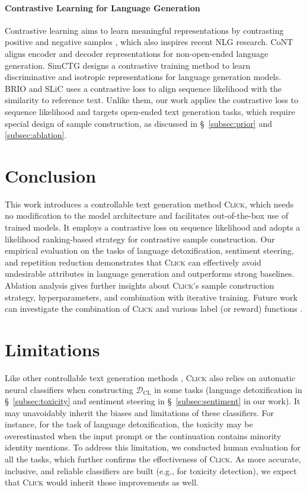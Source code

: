 \paragraph{Contrastive Learning for Language Generation} Contrastive learning aims to learn meaningful representations by contrasting positive and negative samples \cite{chen2020simple, he2020momentum, simcse}, which also inspires recent NLG research. CoNT \cite{cont} aligns encoder and decoder representations for non-open-ended language generation. SimCTG \cite{simctg} designs a contrastive training method to learn discriminative and isotropic representations for language generation models. BRIO \cite{brio} and SLiC \cite{slic} uses a contrastive loss to align sequence likelihood with the similarity to reference text. Unlike them, our work applies the contrastive loss to sequence likelihood and targets open-ended text generation tasks, which require special design of sample construction, as discussed in \S~\ref{subsec:prior} and \ref{subsec:ablation}.

\section{Conclusion}

This work introduces a controllable text generation method \textsc{Click}, which needs no modification to the model architecture and facilitates out-of-the-box use of trained models. It employs a contrastive loss on sequence likelihood and adopts a likelihood ranking-based strategy for contrastive sample construction. Our empirical evaluation on the tasks of language detoxification, sentiment steering, and repetition reduction demonstrates that \textsc{Click} can effectively avoid undesirable attributes in language generation and outperforms strong baselines. Ablation analysis gives further insights about \textsc{Click}'s sample construction strategy, hyperparameters, and combination with iterative training. Future work can investigate the combination of \textsc{Click} and various label (or reward) functions \cite{instructgpt}.

\section*{Limitations}
\label{sec:limitation}

Like other controllable text generation methods \cite{pplm, gedi, dexperts, quark, director, cringe}, \textsc{Click} also relies on automatic neural classifiers when constructing $\mathcal{D}_\mathrm{CL}$ in some tasks (language detoxification in \S~\ref{subsec:toxicity} and sentiment steering in \S~\ref{subsec:sentiment} in our work). It may unavoidably inherit the biases and limitations of these classifiers. For instance, for the task of language detoxification, the toxicity may be overestimated when the input prompt or the continuation contains minority identity mentions. To address this limitation, we conducted human evaluation for all the tasks, which further confirms the effectiveness of \textsc{Click}.
As more accurate, inclusive, and reliable classifiers are built (e.g., for toxicity detection), we expect that \textsc{Click} would inherit those improvements as well.

